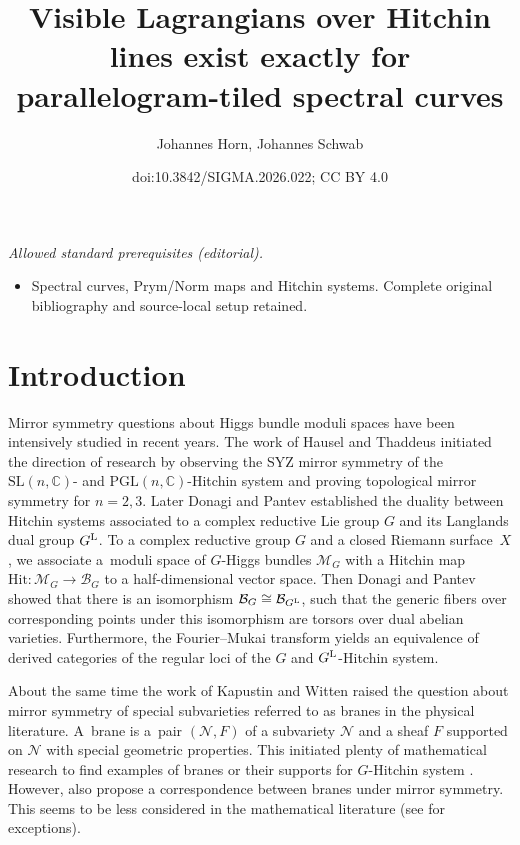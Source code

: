 \documentclass[10pt,a4paper]{amsart}
\title{Visible Lagrangians over Hitchin lines exist exactly for parallelogram-tiled spectral curves}
\author{Johannes Horn, Johannes Schwab}
\date{doi:10.3842/SIGMA.2026.022; CC BY 4.0}
\numberwithin{equation}{section}
\theoremstyle{definition}
\renewcommand{\to}{\rightarrow}
\newcommand{\calB}{\mathcal{B}}
\newcommand{\calM}{\mathcal{M}}
\newcommand{\calN}{\mathcal{N}}
\newcommand{\CC}{\mathbb{C}}
\newcommand{\Hit}{\mathrm{Hit}}
\newcommand{\SL}{\mathrm{SL}}
\newcommand{\PGL}{\mathrm{PGL}}
\begin{document}
\maketitle
\noindent\textit{Allowed standard prerequisites (editorial).}\begin{itemize}
\item Spectral curves, Prym/Norm maps and Hitchin systems. Complete original bibliography and source-local setup retained.
\end{itemize}\medskip
\section{Introduction}
Mirror symmetry questions about Higgs bundle moduli spaces have been intensively studied in recent years. The work of Hausel and Thaddeus \cite{HauselThaddeus} initiated the direction of research by observing the SYZ mirror symmetry of the $\SL(n,\CC)$- and $\PGL(n,\CC)$-Hitchin system and proving topological mirror symmetry for $n=2,3$. Later Donagi and Pantev \cite{DonagiPantev} established the duality between Hitchin systems associated to a complex reductive Lie group $G$ and its Langlands dual group $G^{\rm L}$. To a complex reductive group $G$ and a closed Riemann surface~$X$, we associate a~moduli space of $G$-Higgs bundles $\calM_G$ with a Hitchin map $\Hit\colon \calM_G \to \calB_G$ to a half-dimensional vector space. Then Donagi and Pantev showed that there is an isomorphism $\calB_G \cong \calB_{G^{\rm L}}$, such that the generic fibers over corresponding points under this isomorphism are torsors over dual abelian varieties. Furthermore, the Fourier--Mukai transform yields an equivalence of derived categories of the regular loci of the $G$ and $G^{\rm L}$-Hitchin system.

About the same time the work of Kapustin and Witten \cite{KapustinWitten} raised the question about mirror symmetry of special subvarieties referred to as branes in the physical literature. A~brane is a~pair $(\calN,F)$ of a subvariety $\calN$ and a sheaf $F$ supported on $\calN$ with special geometric properties. This initiated plenty of mathematical research to find examples of branes or their supports for $G$\nobreakdash-Hitchin system \cite{BaragliaSchaposnik1,BaragliaSchaposnik2, FrancoJardim, FrancoPeon, HauselHitchin, HellerSchaposnik, HitchinSpUmm, HitchinSpinors}. However, \cite{KapustinWitten} also propose a correspondence between branes under mirror symmetry. This seems to be less considered in the mathematical literature (see \cite{FrancoJardim, FrancoPeon, HauselHitchin, HitchinSpUmm} for exceptions).
\end{document}
